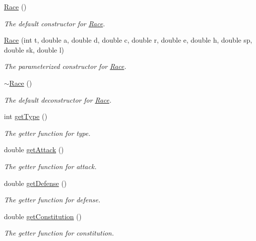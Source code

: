 \begin{DoxyCompactItemize}
\item 
\mbox{\hyperlink{class_race_a351f212954e056cd030a7207934f1570}{Race}} ()
\begin{DoxyCompactList}\small\item\em The default constructor for \mbox{\hyperlink{class_race}{Race}}. \end{DoxyCompactList}\item 
\mbox{\hyperlink{class_race_a9a9facf560a2d7d99db2035eb43a5705}{Race}} (int t, double a, double d, double c, double r, double e, double h, double sp, double sk, double l)
\begin{DoxyCompactList}\small\item\em The parameterized constructor for \mbox{\hyperlink{class_race}{Race}}. \end{DoxyCompactList}\item 
\mbox{\hyperlink{class_race_ad6bfb0bc96485e23b3bf45d794b5b536}{$\sim$\+Race}} ()
\begin{DoxyCompactList}\small\item\em The default deconstructor for \mbox{\hyperlink{class_race}{Race}}. \end{DoxyCompactList}\item 
int \mbox{\hyperlink{class_race_a8329ee6c2098b295dda293142b47e064}{get\+Type}} ()
\begin{DoxyCompactList}\small\item\em The getter function for type. \end{DoxyCompactList}\item 
double \mbox{\hyperlink{class_race_a34a22d44a5d98cb28841e3fccef0bbf7}{get\+Attack}} ()
\begin{DoxyCompactList}\small\item\em The getter function for attack. \end{DoxyCompactList}\item 
double \mbox{\hyperlink{class_race_a8f6db9fb65c4ca28323479378fe5d778}{get\+Defense}} ()
\begin{DoxyCompactList}\small\item\em The getter function for defense. \end{DoxyCompactList}\item 
double \mbox{\hyperlink{class_race_a10097a6f7879d1f31e1f7fec6eb433ad}{get\+Constitution}} ()
\begin{DoxyCompactList}\small\item\em The getter function for constitution. \end{DoxyCompactList}\item 

\end{DoxyCompactItemize}
